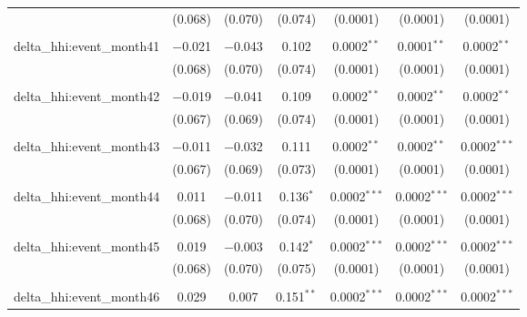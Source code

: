 \begin{table}[H]
{\begin{tabular}{@{\extracolsep{5pt}}lcccccc}
   & (0.068) & (0.070) & (0.074) & (0.0001) & (0.0001) & (0.0001) \\  

   & & & & & & \\  

  delta\_hhi:event\_month41 & $-$0.021 & $-$0.043 & 0.102 & 0.0002$^{**}$ & 0.0001$^{**}$ & 0.0002$^{**}$ \\  

   & (0.068) & (0.070) & (0.074) & (0.0001) & (0.0001) & (0.0001) \\  

   & & & & & & \\  

  delta\_hhi:event\_month42 & $-$0.019 & $-$0.041 & 0.109 & 0.0002$^{**}$ & 0.0002$^{**}$ & 0.0002$^{**}$ \\  

   & (0.067) & (0.069) & (0.074) & (0.0001) & (0.0001) & (0.0001) \\  

   & & & & & & \\  

  delta\_hhi:event\_month43 & $-$0.011 & $-$0.032 & 0.111 & 0.0002$^{**}$ & 0.0002$^{**}$ & 0.0002$^{***}$ \\  

   & (0.067) & (0.069) & (0.073) & (0.0001) & (0.0001) & (0.0001) \\  

   & & & & & & \\  

  delta\_hhi:event\_month44 & 0.011 & $-$0.011 & 0.136$^{*}$ & 0.0002$^{***}$ & 0.0002$^{***}$ & 0.0002$^{***}$ \\  

   & (0.068) & (0.070) & (0.074) & (0.0001) & (0.0001) & (0.0001) \\  

   & & & & & & \\  

  delta\_hhi:event\_month45 & 0.019 & $-$0.003 & 0.142$^{*}$ & 0.0002$^{***}$ & 0.0002$^{***}$ & 0.0002$^{***}$ \\  

   & (0.068) & (0.070) & (0.075) & (0.0001) & (0.0001) & (0.0001) \\  

   & & & & & & \\  

  delta\_hhi:event\_month46 & 0.029 & 0.007 & 0.151$^{**}$ & 0.0002$^{***}$ & 0.0002$^{***}$ & 0.0002$^{***}$ \\  


\end{tabular}}
\end{table}
